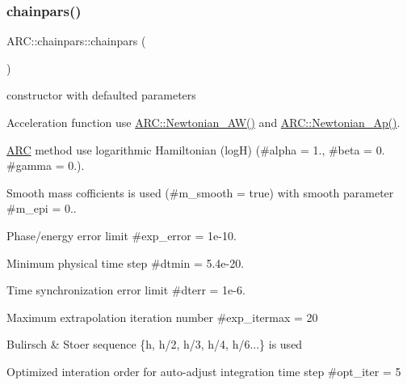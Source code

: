 \subsubsection{\texorpdfstring{chainpars()}{chainpars()}\hspace{0.1cm}{\footnotesize\ttfamily [1/2]}}
{\footnotesize\ttfamily A\+R\+C\+::chainpars\+::chainpars (\begin{DoxyParamCaption}{ }\end{DoxyParamCaption})\hspace{0.3cm}{\ttfamily [inline]}}



constructor with defaulted parameters 


\begin{DoxyItemize}
\item Acceleration function use \hyperlink{namespaceARC_a3c3f20df43ba5df3e21857643130d784}{A\+R\+C\+::\+Newtonian\+\_\+\+A\+W()} and \hyperlink{namespaceARC_a6b8ee871e0832b6b59968ea9069877e0}{A\+R\+C\+::\+Newtonian\+\_\+\+Ap()}.
\item \hyperlink{namespaceARC}{A\+RC} method use logarithmic Hamiltonian (logH) (\#alpha = 1., \#beta = 0. \#gamma = 0.).
\item Smooth mass cofficients is used (\#m\+\_\+smooth = true) with smooth parameter \#m\+\_\+epi = 0..
\item Phase/energy error limit \#exp\+\_\+error = 1e-\/10.
\item Minimum physical time step \#dtmin = 5.\+4e-\/20.
\item Time synchronization error limit \#dterr = 1e-\/6.
\item Maximum extrapolation iteration number \#exp\+\_\+itermax = 20
\item Bulirsch \& Stoer sequence \{h, h/2, h/3, h/4, h/6...\} is used
\item Optimized interation order for auto-\/adjust integration time step \#opt\+\_\+iter = 5 
\end{DoxyItemize}\hypertarget{classARC_1_1chainpars_a6495ce7c673679d5768e309887e0d502}{}\label{classARC_1_1chainpars_a6495ce7c673679d5768e309887e0d502} 

